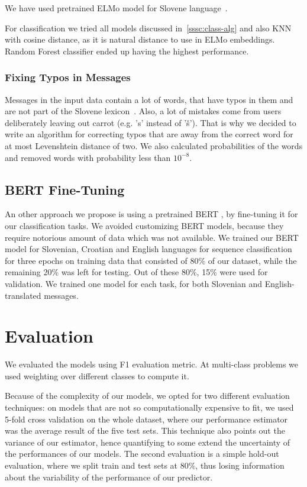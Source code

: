 \documentclass[11pt,a4paper]{article}
\begin{document}
We have used pretrained ELMo model for Slovene language~\cite{elmosl}. 

For classification we tried all models discussed in~\ref{sssc:class-alg} and also KNN~\cite{fukunaga1975branch} with cosine distance, as it is natural distance to use in ELMo embeddings. Random Forest classifier ended up having the highest performance.

\subsubsection{Fixing Typos in Messages}
Messages in the input data contain a lot of words, that have typos in them and are not part of the Slovene lexicon~\cite{11356/1230}. Also, a lot of mistakes come from users deliberately leaving out carrot (e.g. 's' instead of 'š'). That is why we decided to write an algorithm for correcting typos that are away from the correct word for at most Levenshtein distance of two. We also calculated probabilities of the words and removed words with probability less than $10^{-8}$. 

\subsection{BERT Fine-Tuning}
An other approach we propose is using a pretrained BERT \cite{devlin2018bert}, by fine-tuning it for our classification tasks. We avoided customizing BERT models, because they require notorious amount of data which was not available. We trained our BERT model for Slovenian, Croatian and English languages for sequence classification for three epochs on training data that consisted of 80\% of our dataset, while the remaining 20\% was left for testing. Out of these 80\%, 15\% were used for validation. We trained one model for each task, for both Slovenian and English-translated messages.

\section{Evaluation}
We evaluated the models using F1 evaluation metric. At multi-class problems we used weighting over different classes to compute it. 

Because of the complexity of our models, we opted for two different evaluation techniques: on models that are not so computationally expensive to fit, we used 5-fold cross validation on the whole dataset, where our performance estimator was the average result of the five test sets. This technique also points out the variance of our estimator, hence quantifying to some extend the uncertainty of the performances of our models. The second evaluation is a simple hold-out evaluation, where we split train and test sets at 80\%, thus losing information about the variability of the performance of our predictor.
\end{document}
